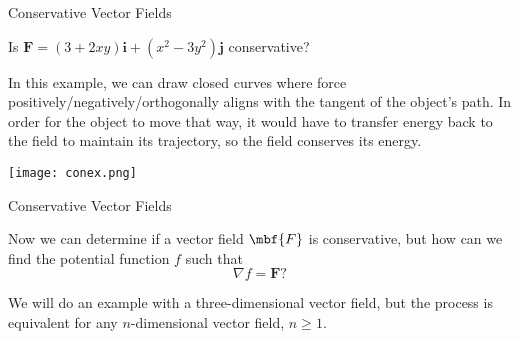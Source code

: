 \documentclass[11pt,english,
handout
]{beamer}
\begin{document}
\begin{frame}[t]{Conservative Vector Fields}
\small

\begin{example}
Is $\mathbf{F}=(3+2xy)\mathbf{i}+(x^2-3y^2)\mathbf{j}$ conservative?

\lspace
\begin{center}
\begin{minipage}{0.4\textwidth}

In this example, we can draw closed curves where force positively/negatively/orthogonally aligns with the tangent of the object's path. In order for the object to move that way, it would have to transfer energy back to the field to maintain its trajectory, so the field conserves its energy.
\end{minipage}\hspace{1cm}%
\begin{minipage}{0.5\textwidth}
\centering
\texttt{[image: conex.png]}
\end{minipage}
\end{center}
\end{example}
\end{frame}






















\begin{frame}{Conservative Vector Fields}
\small

Now we can determine if a vector field $\mbf{F}$ is conservative, but how can we find the potential function $f$ such that 
\[
\nabla f=\mathbf{F}?
\]\pause 

\lspace
We will do an example with a three-dimensional vector field, but the process is equivalent for any $n$-dimensional vector field, $n\geq1$.
\end{frame}










\end{document}
